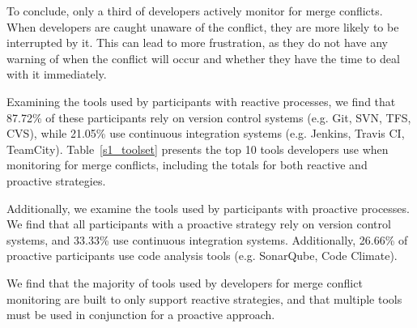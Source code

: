 To conclude, only a third of developers actively monitor for merge conflicts.
When developers are caught unaware of the conflict, they are more likely to be interrupted by it.
This can lead to more frustration, as they do not have any warning of when the conflict will occur and whether they have the time to deal with it immediately.


Examining the tools used by participants with reactive processes, we find that 87.72\% of these participants rely on version control systems (e.g. Git, SVN, TFS, CVS), while 21.05\% use continuous integration systems (e.g. Jenkins, Travis CI, TeamCity).
Table~\ref{s1_toolset} presents the top 10 tools developers use when monitoring for merge conflicts, including the totals for both reactive and proactive strategies.

Additionally, we examine the tools used by participants with proactive processes.
We find that all participants with a proactive strategy rely on version control systems, and 33.33\% use continuous integration systems.
Additionally, 26.66\% of proactive participants use code analysis tools (e.g. SonarQube, Code Climate).

We find that the majority of tools used by developers for merge conflict monitoring are built to only support reactive strategies, and that multiple tools must be used in conjunction for a proactive approach.


\newcolumntype{b}{X}

